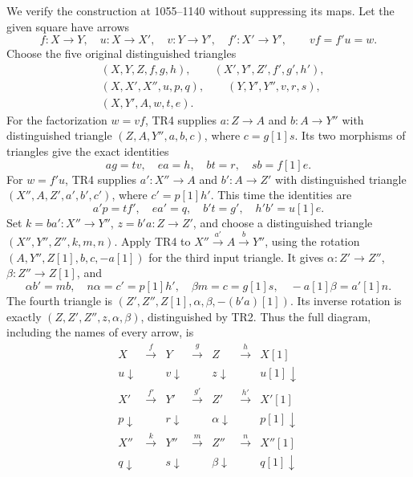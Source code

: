 We verify the construction at 1055–\allowbreak{}1140 without suppressing its maps. Let the given square have arrows \[
f:X\to Y,\quad u:X\to X',\quad v:Y\to Y',\quad
f':X'\to Y',\qquad vf=f'u=w.
\] Choose the five original distinguished triangles \[
\begin{split}
&(X,Y,Z,f,g,h),\qquad(X',Y',Z',f',g',h'),\\
&(X,X',X'',u,p,q),\qquad(Y,Y',Y'',v,r,s),\\
&(X,Y',A,w,t,e).
\end{split}
\] For the factorization \(w=vf\),\allowbreak{} TR4 supplies \(a:Z\to A\) and \(b:A\to Y''\) with distinguished triangle \((Z,A,Y'',a,b,c)\),\allowbreak{} where \(c=g[1]s\). Its two morphisms of triangles give the exact identities \[
ag=tv,\quad ea=h,\quad bt=r,\quad sb=f[1]e.
\] For \(w=f'u\),\allowbreak{} TR4 supplies \(a':X''\to A\) and \(b':A\to Z'\) with distinguished triangle \((X'',A,Z',a',b',c')\),\allowbreak{} where \(c'=p[1]h'\). This time the identities are \[
a'p=tf',\quad ea'=q,\quad b't=g',\quad h'b'=u[1]e.
\] Set \(k=ba':X''\to Y''\),\allowbreak{} \(z=b'a:Z\to Z'\),\allowbreak{} and choose a distinguished triangle \((X'',Y'',Z'',k,m,n)\). Apply TR4 to \(X''\xrightarrow{a'}A\xrightarrow bY''\),\allowbreak{} using the rotation \((A,Y'',Z[1],b,c,-a[1])\) for the third input triangle. It gives \(\alpha:Z'\to Z''\),\allowbreak{} \(\beta:Z''\to Z[1]\),\allowbreak{} and \[
\alpha b'=mb,\quad n\alpha=c'=p[1]h',\quad
\beta m=c=g[1]s,\quad -a[1]\beta=a'[1]n.
\] The fourth triangle is \((Z',Z'',Z[1],\alpha,\beta,-(b'a)[1])\). Its inverse rotation is exactly \((Z,Z',Z'',z,\alpha,\beta)\),\allowbreak{} distinguished by TR2. Thus the full diagram,\allowbreak{} including the names of every arrow,\allowbreak{} is \[
\begin{array}{ccccccc}
X&\xrightarrow f&Y&\xrightarrow g&Z&\xrightarrow h&X[1]\\
{\scriptstyle u}\downarrow&&{\scriptstyle v}\downarrow&&
 {\scriptstyle z}\downarrow&&{\scriptstyle u[1]}\downarrow\\
X'&\xrightarrow{f'}&Y'&\xrightarrow{g'}&Z'&\xrightarrow{h'}&X'[1]\\
{\scriptstyle p}\downarrow&&{\scriptstyle r}\downarrow&&
 {\scriptstyle\alpha}\downarrow&&{\scriptstyle p[1]}\downarrow\\
X''&\xrightarrow k&Y''&\xrightarrow m&Z''&\xrightarrow n&X''[1]\\
{\scriptstyle q}\downarrow&&{\scriptstyle s}\downarrow&&
 {\scriptstyle\beta}\downarrow&&{\scriptstyle q[1]}\downarrow\\

\end{array}\]
